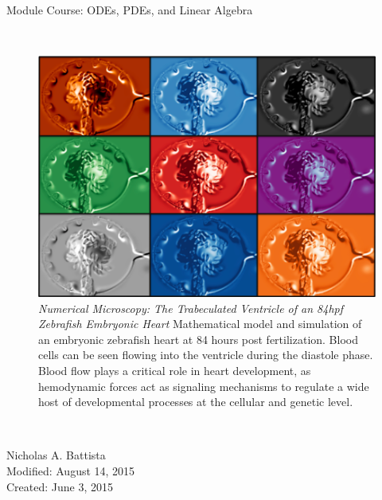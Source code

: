 \documentclass{article}
\begin{document}
\begin{center}
$ $\\
\vspace{0.5in}
\huge Module Course: ODEs, PDEs, and Linear Algebra
\end{center}
$ $\\
\vspace{0.25in}
%
\pagestyle{plain}
\setcounter{page}{1}
%
\begin{figure}[hb] 
\centering 
\includegraphics[width=5.5in]{cover.png} 
\caption[Close up of \textit{Hemidactylus} sp.] {\emph{Numerical Microscopy: The Trabeculated Ventricle of an 84hpf  Zebrafish Embryonic Heart} Mathematical model and simulation of an embryonic zebrafish heart at 84 hours post fertilization. Blood cells can be seen flowing into the ventricle during the diastole phase. Blood flow plays a critical role in heart development, as hemodynamic forces act as signaling mechanisms to regulate a wide host of developmental processes at the cellular and genetic level.} 
\end{figure}
%
$ $\\
\vspace{0.25in}
%
\setcounter{page}{1}
%
\begin{center}
\Large Nicholas A. Battista\\
\Large Modified: August 14, 2015\\
\Large Created: June 3, 2015\\
\end{center}

\newpage

\newpage

\newpage

\newpage

\newpage

\newpage

\newpage

\end{document}
